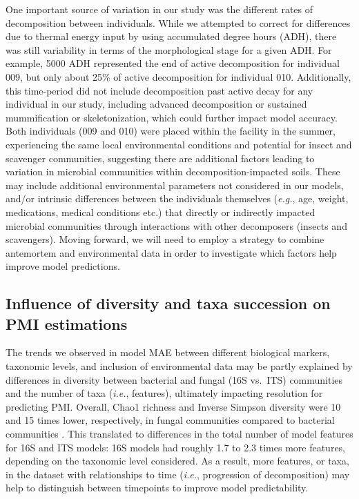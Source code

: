 \documentclass[
  10pt,
  letterpaper,
]{article}
\begin{document}
One important source of variation in our study was the different rates
of decomposition between individuals. While we attempted to correct for
differences due to thermal energy input by using accumulated degree
hours (ADH), there was still variability in terms of the morphological
stage for a given ADH. For example, 5000 ADH represented the end of
active decomposition for individual 009, but only about 25\% of active
decomposition for individual 010. Additionally, this time-period did not
include decomposition past active decay for any individual in our study,
including advanced decomposition or sustained mummification or
skeletonization, which could further impact model accuracy. Both
individuals (009 and 010) were placed within the facility in the summer,
experiencing the same local environmental conditions and potential for
insect and scavenger communities, suggesting there are additional
factors leading to variation in microbial communities within
decomposition-impacted soils. These may include additional environmental
parameters not considered in our models, and/or intrinsic differences
between the individuals themselves (\emph{e.g.}, age, weight,
medications, medical conditions etc.) that directly or indirectly
impacted microbial communities through interactions with other
decomposers (insects and scavengers). Moving forward, we will need to
employ a strategy to combine antemortem and environmental data in order
to investigate which factors help improve model predictions.

\hypertarget{influence-of-diversity-and-taxa-succession-on-pmi-estimations}{%
\subsection{Influence of diversity and taxa succession on PMI
estimations}\label{influence-of-diversity-and-taxa-succession-on-pmi-estimations}}

The trends we observed in model MAE between different biological
markers, taxonomic levels, and inclusion of environmental data may be
partly explained by differences in diversity between bacterial and
fungal (16S vs.~ITS) communities and the number of taxa (\emph{i.e.},
features), ultimately impacting resolution for predicting PMI. Overall,
Chao1 richness and Inverse Simpson diversity were 10 and 15 times lower,
respectively, in fungal communities compared to bacterial communities
\citep{mason_body_2022}. This translated to differences in the total
number of model features for 16S and ITS models: 16S models had roughly
1.7 to 2.3 times more features, depending on the taxonomic level
considered. As a result, more features, or taxa, in the dataset with
relationships to time (\emph{i.e.}, progression of decomposition) may
help to distinguish between timepoints to improve model predictability.
\end{document}
